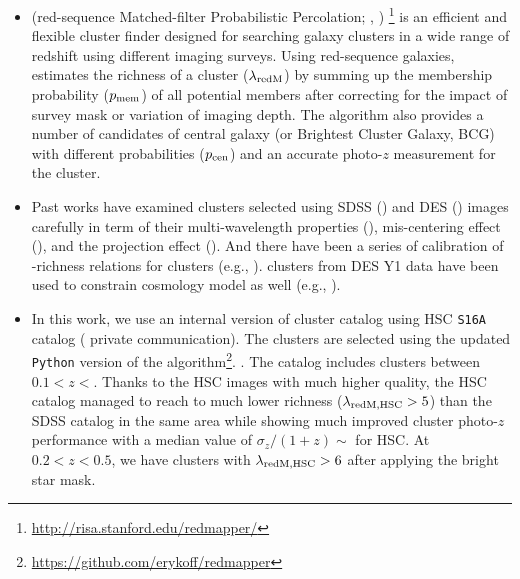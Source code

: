 \documentclass[fleqn,usenatbib,useAMS,english]{mnras}
\begin{document}
    \begin{itemize}

        \item \redm{} (red-sequence Matched-filter Probabilistic Percolation;
            \citealt{Rykoff2014, Rozo2014, Rozo2015a, Rozo2015b}, )
            \footnote{\url{http://risa.stanford.edu/redmapper/}} is an efficient and
            flexible cluster finder designed for searching galaxy clusters in a wide
            range of redshift using different imaging surveys.
            Using red-sequence galaxies, \redm{} estimates the richness of a cluster
            ($\lambda_{\rm redM}$) by summing up the membership probability
            ($p_{\rm mem}$) of all potential members after correcting for the
            impact of survey mask or variation of imaging depth.
            The algorithm also provides a number of candidates of central galaxy
            (or Brightest Cluster Galaxy, BCG) with different probabilities ($p_{\rm cen}$)
            and an accurate photo-$z$ measurement for the cluster.

        \item Past works have examined \redm{} clusters selected using SDSS (\addref{}) and DES
            (\addref{}) images carefully in term of their multi-wavelength properties
            (\addref{}), mis-centering effect (\addref{}), and the projection effect (\addref{}).
            And there have been a series of calibration of \mvir{}-richness relations
            for \redm{} clusters (e.g., \addref{}).
            \redm{} clusters from DES Y1 data have been used to constrain cosmology model
            as well (e.g., \addref{}).

        \item In this work, we use an internal version of \redm{} cluster catalog using
            HSC \texttt{S16A} catalog ( private communication).
            The clusters are selected using the updated \texttt{Python} version of the
            \redm{} algorithm\footnote{\url{https://github.com/erykoff/redmapper}}.
            .
            The catalog includes  clusters between $0.1 < z <$.
            Thanks to the HSC images with much higher quality, the HSC \redm{} catalog
            managed to reach to much lower richness ($\lambda_{\rm redM, HSC} > 5$)
            than the SDSS \redm{} catalog in the same area while showing much improved
            cluster photo-$z$ performance with a median value of
            $\sigma_{z}/(1 + z) \sim$ for HSC.
            At $0.2 < z < 0.5$, we have  clusters with
            $\lambda_{\rm redM, HSC} > 6$ after applying the bright star mask.


\end{itemize}
\end{document}
